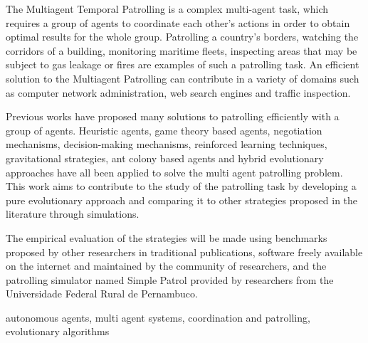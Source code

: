 The Multiagent Temporal Patrolling is a complex multi-agent task, which requires 
a group of agents to coordinate each other’s actions in order to obtain optimal 
results for the whole group. Patrolling a country’s borders, watching the 
corridors of a building, monitoring maritime fleets, inspecting areas that may be 
subject to gas leakage or fires are examples of such a patrolling task. An 
efficient solution to the Multiagent Patrolling can contribute in a variety of 
domains such as computer network administration, web search engines and traffic 
inspection.

Previous works have proposed many solutions to patrolling efficiently with a group 
of agents. Heuristic agents, game theory based agents, negotiation mechanisms, 
decision-making mechanisms, reinforced learning techniques, gravitational strategies, 
ant colony based agents and hybrid evolutionary approaches have all been applied to 
solve the multi agent patrolling problem. This work aims to contribute to the study 
of the patrolling task by developing a pure evolutionary approach and comparing it 
to other strategies proposed in the literature through simulations.

The empirical evaluation of the strategies will be made using benchmarks proposed by 
other researchers in traditional publications, software freely available on the 
internet and maintained by the community of researchers, and the patrolling simulator 
named Simple Patrol provided by researchers from the 
Universidade Federal Rural de Pernambuco.

\begin{keywords}
autonomous agents, multi agent systems, coordination and patrolling, evolutionary 
algorithms
\end{keywords}